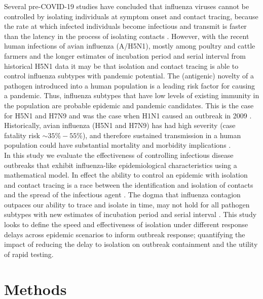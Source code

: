 \documentclass{article}
\begin{document}
Several pre-COVID-19 studies have concluded that influenza viruses cannot be controlled by isolating individuals at symptom onset and contact tracing, because the rate at which infected individuals become infectious and transmit is faster than the latency in the process of isolating contacts \citep{fraserFactorsThatMake2004, klinkenbergEffectivenessContactTracing2006}. However, with the recent human infections of avian influenza (A/H5N1), mostly among poultry and cattle farmers \citep{gargHighlyPathogenicAvian2025} and the longer estimates of incubation period and serial interval from historical H5N1 data \citep{Ward2024.12.11.24318702} it may be that isolation and contact tracing is able to control influenza subtypes with pandemic potential. The (antigenic) novelty of a pathogen introduced into a human population is a leading risk factor for causing a pandemic. Thus, influenza subtypes that have low levels of existing immunity in the population are probable epidemic and pandemic candidates. This is the case for H5N1 \citep{Ward2024.12.11.24318702} and H7N9 \citep{tannerPandemicPotentialAvian2015} and was the case when H1N1 caused an outbreak in 2009 \citep{fraserPandemicPotentialStrain2009}. Historically, avian influenza (H5N1 and H7N9) has had high severity (case fatality risk $\sim 35\%-55\%$), and therefore sustained transmission in a human population could have substantial mortality and morbidity implications \citep{tannerPandemicPotentialAvian2015}. \\

In this study we evaluate the effectiveness of controlling infectious disease outbreaks that exhibit influenza-like epidemiological characteristics using a mathematical model. In effect the ability to control an epidemic with isolation and contact tracing is a race between the identification and isolation of contacts and the spread of the infectious agent \citep{reyna-laraVirusSpreadContact2021}. The dogma that influenza contagion outpaces our ability to trace and isolate in time, may not hold for all pathogen subtypes with new estimates of incubation period and serial interval \citep{Ward2024.12.11.24318702}. This study looks to define the speed and effectiveness of isolation under different response delays across epidemic scenarios to inform outbreak response; quantifying the impact of reducing the delay to isolation on outbreak containment and the utility of rapid testing.

\section*{Methods}
\end{document}
